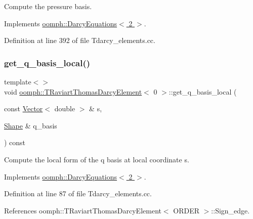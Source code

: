 Compute the pressure basis. 



Implements \hyperlink{classoomph_1_1DarcyEquations_ab413b560166194e4a9d1b7de4742c5c0}{oomph\+::\+Darcy\+Equations$<$ 2 $>$}.



Definition at line 392 of file Tdarcy\+\_\+elements.\+cc.

\mbox{\label{classoomph_1_1TRaviartThomasDarcyElement_a4d60f4e499f6fc7a1ec123b019231a14}} 
\subsubsection{\texorpdfstring{get\+\_\+q\+\_\+basis\+\_\+local()}{get\_q\_basis\_local()}\hspace{0.1cm}{\footnotesize\ttfamily [1/3]}}
{\footnotesize\ttfamily template$<$$>$ \\
void \hyperlink{classoomph_1_1TRaviartThomasDarcyElement}{oomph\+::\+T\+Raviart\+Thomas\+Darcy\+Element}$<$ 0 $>$\+::get\+\_\+q\+\_\+basis\+\_\+local (\begin{DoxyParamCaption}\item[{const \hyperlink{classoomph_1_1Vector}{Vector}$<$ double $>$ \&}]{s,  }\item[{\hyperlink{classoomph_1_1Shape}{Shape} \&}]{q\+\_\+basis }\end{DoxyParamCaption}) const\hspace{0.3cm}{\ttfamily [virtual]}}



Compute the local form of the q basis at local coordinate s. 



Implements \hyperlink{classoomph_1_1DarcyEquations_ae4098060d7311ceab8ad7673876f070c}{oomph\+::\+Darcy\+Equations$<$ 2 $>$}.



Definition at line 87 of file Tdarcy\+\_\+elements.\+cc.



References oomph\+::\+T\+Raviart\+Thomas\+Darcy\+Element$<$ O\+R\+D\+E\+R $>$\+::\+Sign\+\_\+edge.

